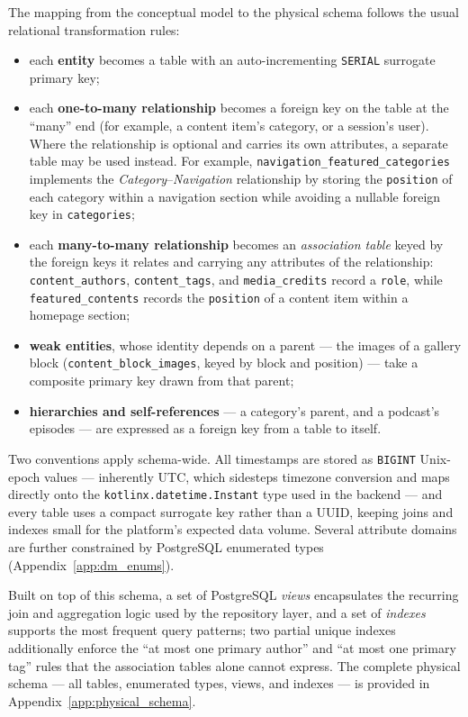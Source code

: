 The mapping from the conceptual model to the physical schema follows the usual relational
transformation rules:

\begin{itemize}
      \item each \textbf{entity} becomes a table with an auto-incrementing \texttt{SERIAL}
            surrogate primary key;
      \item each \textbf{one-to-many relationship} becomes a foreign key on the table at the
            ``many'' end (for example, a content item's category, or a session's user).
            Where the relationship is optional and carries its own attributes,
            a separate table may be used instead. For example,
            \texttt{navigation\_featured\_categories} implements the
            \emph{Category}--\emph{Navigation} relationship by storing the
            \texttt{position} of each category within a navigation section while avoiding a
            nullable foreign key in \texttt{categories};
      \item each \textbf{many-to-many relationship} becomes an \emph{association table}
            keyed by the foreign keys it relates and carrying any attributes of the
            relationship: \texttt{content\_authors}, \texttt{content\_tags}, and
            \texttt{media\_credits} record a \texttt{role}, while
            \texttt{featured\_contents} records the \texttt{position} of a content item
            within a homepage section;
      \item \textbf{weak entities}, whose identity depends on a parent --- the images of a
            gallery block (\texttt{content\_block\_images}, keyed by block and position) ---
            take a composite primary key drawn from that parent;
      \item \textbf{hierarchies and self-references} --- a category's parent, and a
            podcast's episodes --- are expressed as a foreign key from a table to itself.
\end{itemize}

Two conventions apply schema-wide. All timestamps are stored as \texttt{BIGINT} Unix-epoch
values --- inherently UTC, which sidesteps timezone conversion and maps directly onto the
\texttt{kotlinx.datetime.Instant} type used in the backend --- and every table uses a
compact surrogate key rather than a UUID, keeping joins and indexes small for the platform's
expected data volume. Several attribute domains are further constrained by PostgreSQL
enumerated types (Appendix~\ref{app:dm_enums}).

Built on top of this schema, a set of PostgreSQL \emph{views} encapsulates the recurring
join and aggregation logic used by the repository layer, and a set of \emph{indexes}
supports the most frequent query patterns; two partial unique indexes additionally enforce
the ``at most one primary author'' and ``at most one primary tag'' rules that the
association tables alone cannot express. The complete physical schema --- all tables,
enumerated types, views, and indexes --- is provided in Appendix~\ref{app:physical_schema}.

